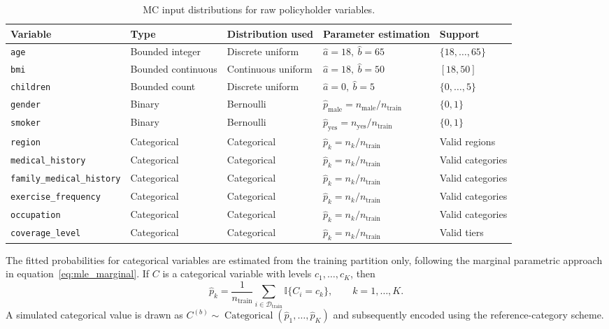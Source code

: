 \begin{table}[H]
\centering
\small
\renewcommand{\arraystretch}{1.18}
\begin{tabular}{p{}p{}p{}p{}p{}}
\toprule
\textbf{Variable} &
\textbf{Type} &
\textbf{Distribution used} &
\textbf{Parameter estimation} &
\textbf{Support} \\
\midrule
\texttt{age} &
Bounded integer &
Discrete uniform &
$\widehat{a}=18,\ \widehat{b}=65$ &
$\{18,\ldots,65\}$ \\
\texttt{bmi} &
Bounded continuous &
Continuous uniform &
$\widehat{a}=18,\ \widehat{b}=50$ &
$[18,50]$ \\
\texttt{children} &
Bounded count &
Discrete uniform &
$\widehat{a}=0,\ \widehat{b}=5$ &
$\{0,\ldots,5\}$ \\
\texttt{gender} &
Binary &
Bernoulli &
$\widehat{p}_{\mathrm{male}} = n_{\mathrm{male}}/n_{\mathrm{train}}$ &
$\{0,1\}$ \\
\texttt{smoker} &
Binary &
Bernoulli &
$\widehat{p}_{\mathrm{yes}} = n_{\mathrm{yes}}/n_{\mathrm{train}}$ &
$\{0,1\}$ \\
\texttt{region} &
Categorical &
Categorical &
$\widehat{p}_{k}=n_k/n_{\mathrm{train}}$ &
Valid regions \\
\texttt{medical\_\allowbreak{}history} &
Categorical &
Categorical &
$\widehat{p}_{k}=n_k/n_{\mathrm{train}}$ &
Valid categories \\
\texttt{family\_medical\_\allowbreak{}history} &
Categorical &
Categorical &
$\widehat{p}_{k}=n_k/n_{\mathrm{train}}$ &
Valid categories \\
\texttt{exercise\_\allowbreak{}frequency} &
Categorical &
Categorical &
$\widehat{p}_{k}=n_k/n_{\mathrm{train}}$ &
Valid categories \\
\texttt{occupation} &
Categorical &
Categorical &
$\widehat{p}_{k}=n_k/n_{\mathrm{train}}$ &
Valid categories \\
\texttt{coverage\_\allowbreak{}level} &
Categorical &
Categorical &
$\widehat{p}_{k}=n_k/n_{\mathrm{train}}$ &
Valid tiers \\
\bottomrule
\end{tabular}
\caption{MC input distributions for raw policyholder variables.}
\label{tab:mc_distribution_assumptions_ch3}
\end{table}

The fitted probabilities for categorical variables are estimated from the
training partition only, following the marginal parametric approach in
equation~\eqref{eq:mle_marginal}.  If $C$ is a categorical variable with
levels $c_1,\ldots,c_K$, then
\begin{equation}
    \widehat{p}_{k}
    =
    \frac{1}{n_{\mathrm{train}}}
    \sum_{i \in \mathcal{D}_{\mathrm{train}}}
    \mathbb{I}\{C_i = c_k\},
    \qquad
    k=1,\ldots,K.
    \label{eq:categorical_probability_estimator_ch3}
\end{equation}
A simulated categorical value is drawn as
$C^{(b)} \sim \operatorname{Categorical}(\widehat{p}_1,\ldots,\widehat{p}_K)$
and subsequently encoded using the reference-category scheme.


